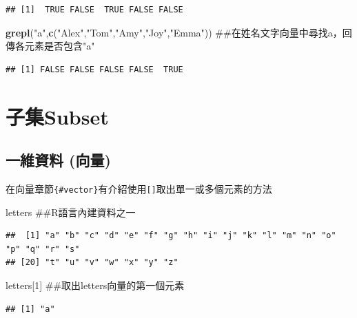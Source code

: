 \documentclass[]{book}
\newenvironment{Shaded}{\begin{snugshade}}{\end{snugshade}}
\newcommand{\KeywordTok}[1]{\textcolor[rgb]{0.13,0.29,0.53}{\textbf{{#1}}}}
\newcommand{\DecValTok}[1]{\textcolor[rgb]{0.00,0.00,0.81}{{#1}}}
\newcommand{\StringTok}[1]{\textcolor[rgb]{0.31,0.60,0.02}{{#1}}}
\newcommand{\NormalTok}[1]{{#1}}
\theoremstyle{definition}
\theoremstyle{definition}
\theoremstyle{remark}
\begin{document}
\begin{verbatim}
## [1]  TRUE FALSE  TRUE FALSE FALSE
\end{verbatim}

\begin{Shaded}
\begin{Highlighting}[]
\KeywordTok{grepl}\NormalTok{(}\StringTok{"a"}\NormalTok{,}\KeywordTok{c}\NormalTok{(}\StringTok{"Alex"}\NormalTok{,}\StringTok{"Tom"}\NormalTok{,}\StringTok{"Amy"}\NormalTok{,}\StringTok{"Joy"}\NormalTok{,}\StringTok{"Emma"}\NormalTok{)) ##在姓名文字向量中尋找a，回傳各元素是否包含"a"}
\end{Highlighting}
\end{Shaded}

\begin{verbatim}
## [1] FALSE FALSE FALSE FALSE  TRUE
\end{verbatim}

\section{子集Subset}\label{subset}

\subsection{一維資料 (向量)}\label{-}

在向量章節\texttt{\{\#vector\}}有介紹使用\texttt{{[}{]}}取出單一或多個元素的方法

\begin{Shaded}
\begin{Highlighting}[]
\NormalTok{letters ##R語言內建資料之一}
\end{Highlighting}
\end{Shaded}

\begin{verbatim}
##  [1] "a" "b" "c" "d" "e" "f" "g" "h" "i" "j" "k" "l" "m" "n" "o" "p" "q" "r" "s"
## [20] "t" "u" "v" "w" "x" "y" "z"
\end{verbatim}

\begin{Shaded}
\begin{Highlighting}[]
\NormalTok{letters[}\DecValTok{1}\NormalTok{] ##取出letters向量的第一個元素}
\end{Highlighting}
\end{Shaded}

\begin{verbatim}
## [1] "a"
\end{verbatim}
\end{document}
